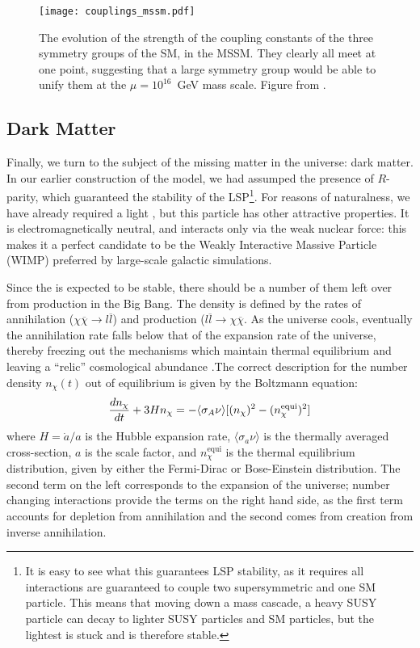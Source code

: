 
\begin{figure}
\centering
\texttt{[image: couplings\_mssm.pdf]}
\label{fig:susy:couplings_mssm}
\caption{The evolution of the strength of the coupling constants of the three symmetry groups of the SM, in the MSSM. They clearly all meet at one point, suggesting that a large symmetry group would be able to unify them at the $\mu = 10^{16}$~GeV mass scale. Figure from \cite{susypheno}.}
\end{figure}


\subsection{Dark Matter}

Finally, we turn to the subject of the missing matter in the universe: dark matter. In our earlier construction of the model, we had assumped the presence of $R$-parity, which guaranteed the stability of the LSP\footnote{It is easy to see what this guarantees LSP stability, as it requires all interactions are guaranteed to couple two supersymmetric and one SM particle. This means that moving down a mass cascade, a heavy SUSY particle can decay to lighter SUSY particles and SM particles, but the lightest is stuck and is therefore stable.}. For reasons of naturalness, we have already required a light \lsp, but this particle has other attractive properties. It is electromagnetically neutral, and interacts only via the weak nuclear force: this makes it a perfect candidate to be the Weakly Interactive Massive Particle (WIMP) preferred by large-scale galactic simulations.  

Since the \lsp is expected to be stable, there should be a number of them left over from production in the Big Bang. The density is defined by the rates of annihilation ($\chi\overline{\chi} \rightarrow l \overline{l}$) and production ($l\overline{l}\rightarrow \chi\overline{\chi}$. As the universe cools, eventually the annihilation rate falls below that of the expansion rate of the universe, thereby freezing out the mechanisms which maintain thermal equilibrium and leaving a ``relic'' cosmological abundance \cite{Jungman}.The correct description for the number density $n_\chi(t)$ out of equilibrium is given by the Boltzmann equation:
\begin{align}
  \frac{d n_\chi}{d t} + 3 H n_\chi = - \langle \sigma_A \nu \rangle [(n_\chi)^2 - (n_\chi^\mathrm{equi})^2]\label{eqn:boltz}
\end{align}
where $H=\dot{a}/a$ is the Hubble expansion rate, $\langle\sigma_a \nu\rangle$ is the thermally averaged cross-section, $a$ is the scale factor, and $n_\chi^\mathrm{equi}$ is the thermal equilibrium distribution, given by either the Fermi-Dirac or Bose-Einstein distribution. The second term on the left corresponds to the expansion of the universe; number changing interactions provide the terms on the right hand side, as the first term accounts for depletion from annihilation and the second comes from creation from inverse annihilation. 

